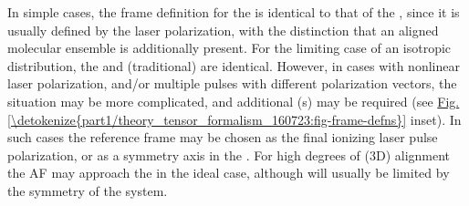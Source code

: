 \documentclass[letterpaper,table,10pt,english]{jupyterBook}
\begin{document}
\sphinxAtStartPar
In simple cases, the frame definition for the {\hyperref[\detokenize{backmatter/glossary:term-AF}]{}} is identical to that of the {\hyperref[\detokenize{backmatter/glossary:term-LF}]{}}, since it is usually defined by the laser polarization, with the distinction that an aligned molecular ensemble is additionally present. For the limiting case of an isotropic distribution, the {\hyperref[\detokenize{backmatter/glossary:term-AF}]{}} and (traditional) {\hyperref[\detokenize{backmatter/glossary:term-LF}]{}} are identical. However, in cases with non\sphinxhyphen{}linear laser polarization, and/or multiple pulses with different polarization vectors, the situation may be more complicated, and additional {\hyperref[\detokenize{backmatter/glossary:term-frame-rotation}]{}}(s) may be required (see \hyperref[\detokenize{part1/theory_tensor_formalism_160723:fig-frame-defns}]{Fig.\@ \ref{\detokenize{part1/theory_tensor_formalism_160723:fig-frame-defns}}} inset). In such cases the reference frame may be chosen as the final ionizing laser pulse polarization, or as a symmetry axis in the {\hyperref[\detokenize{backmatter/glossary:term-AF}]{}}. For high degrees of (3D) alignment the AF may approach the {\hyperref[\detokenize{backmatter/glossary:term-MF}]{}} in the ideal case, although will usually be limited by the symmetry of the system.
\end{document}
